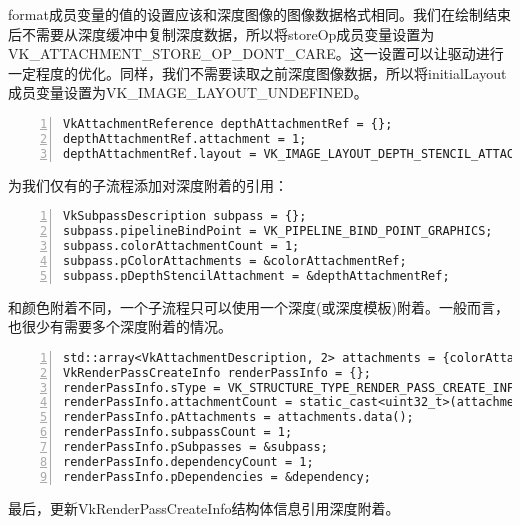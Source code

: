 \documentclass{ctexart}
\begin{document}
format成员变量的值的设置应该和深度图像的图像数据格式相同。我们在绘制结束后不需要从深度缓冲中复制深度数据，所以将storeOp成员变量设置为VK\_ATTACHMENT\_STORE\_OP\_DONT\_CARE。这一设置可以让驱动进行一定程度的优化。同样，我们不需要读取之前深度图像数据，所以将initialLayout成员变量设置为VK\_IMAGE\_LAYOUT\_UNDEFINED。

\begin{lstlisting}[language={[ANSI]C},keywordstyle=\color{blue!70},commentstyle=\color{red!50!green!50!blue!50},frame=shadowbox, rulesepcolor=\color{red!20!green!20!blue!20},basicstyle=\small,numbers=left, numberstyle=\tiny,breaklines=true]
VkAttachmentReference depthAttachmentRef = {};
depthAttachmentRef.attachment = 1;
depthAttachmentRef.layout = VK_IMAGE_LAYOUT_DEPTH_STENCIL_ATTACHMENT_OPTIMAL;
\end{lstlisting}

为我们仅有的子流程添加对深度附着的引用：

\begin{lstlisting}[language={[ANSI]C},keywordstyle=\color{blue!70},commentstyle=\color{red!50!green!50!blue!50},frame=shadowbox, rulesepcolor=\color{red!20!green!20!blue!20},basicstyle=\small,numbers=left, numberstyle=\tiny,breaklines=true]
VkSubpassDescription subpass = {};
subpass.pipelineBindPoint = VK_PIPELINE_BIND_POINT_GRAPHICS;
subpass.colorAttachmentCount = 1;
subpass.pColorAttachments = &colorAttachmentRef;
subpass.pDepthStencilAttachment = &depthAttachmentRef;
\end{lstlisting}

和颜色附着不同，一个子流程只可以使用一个深度(或深度模板)附着。一般而言，也很少有需要多个深度附着的情况。

\begin{lstlisting}[language={[ANSI]C},keywordstyle=\color{blue!70},commentstyle=\color{red!50!green!50!blue!50},frame=shadowbox, rulesepcolor=\color{red!20!green!20!blue!20},basicstyle=\small,numbers=left, numberstyle=\tiny,breaklines=true]
std::array<VkAttachmentDescription, 2> attachments = {colorAttachment, depthAttachment};
VkRenderPassCreateInfo renderPassInfo = {};
renderPassInfo.sType = VK_STRUCTURE_TYPE_RENDER_PASS_CREATE_INFO;
renderPassInfo.attachmentCount = static_cast<uint32_t>(attachments.size());
renderPassInfo.pAttachments = attachments.data();
renderPassInfo.subpassCount = 1;
renderPassInfo.pSubpasses = &subpass;
renderPassInfo.dependencyCount = 1;
renderPassInfo.pDependencies = &dependency;
\end{lstlisting}

最后，更新VkRenderPassCreateInfo结构体信息引用深度附着。
\end{document}
